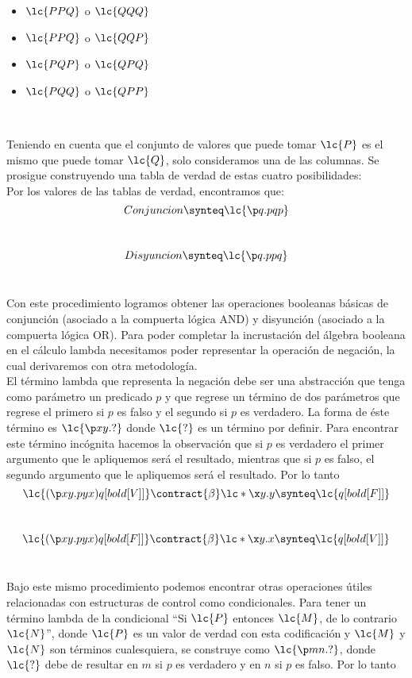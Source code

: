 \begin{itemize}
\item \(\lc{P P Q}\) o \(\lc{Q Q Q}\)
\item \(\lc{P P Q}\) o \(\lc{Q Q P}\)
\item \(\lc{P Q P}\) o \(\lc{Q P Q}\)
\item \(\lc{P Q Q}\) o \(\lc{Q P P}\)
\end{itemize} \

Teniendo en cuenta que el conjunto de valores que puede tomar \(\lc{P}\) es el mismo que puede tomar \(\lc{Q}\), solo consideramos una de las columnas. Se prosigue construyendo una tabla de verdad de estas cuatro posibilidades: \\

Por los valores de las tablas de verdad, encontramos que: \\

\[Conjuncion \synteq \lc{\p q.p q p}\] \

\[Disyuncion \synteq \lc{\p q.p p q}\] \

Con este procedimiento logramos obtener las operaciones booleanas básicas de conjunción (asociado a la compuerta lógica \(\mathrm{AND}\)) y disyunción (asociado a la compuerta lógica \(\mathrm{OR}\)). Para poder completar la incrustación del álgebra booleana en el cálculo lambda necesitamos poder representar la operación de negación, la cual derivaremos con otra metodología. \\

El término lambda que representa la negación debe ser una abstracción que tenga como parámetro un predicado \(p\) y que regrese un término de dos parámetros que regrese el primero si \(p\) es falso y el segundo si \(p\) es verdadero. La forma de éste término es \(\lc{\p x y.?}\) donde \(\lc{?}\) es un término por definir. Para encontrar este término incógnita hacemos la observación que si \(p\) es verdadero el primer argumento que le apliquemos será el resultado, mientras que si \(p\) es falso, el segundo argumento que le apliquemos será el resultado. Por lo tanto \\

\[\lc{(\p x y.p y x)q[bold[V]]} \contract{\beta} \lc*{\x y.y} \synteq \lc{q[bold[F]]}\] \

\[\lc{(\p x y.p y x)q[bold[F]]} \contract{\beta} \lc*{\x y.x} \synteq \lc{q[bold[V]]}\] \

Bajo este mismo procedimiento podemos encontrar otras operaciones útiles relacionadas con estructuras de control como condicionales. Para tener un término lambda de la condicional ``Si \(\lc{P}\) entonces \(\lc{M}\), de lo contrario \(\lc{N}\)'', donde \(\lc{P}\) es un valor de verdad con esta codificación y \(\lc{M}\) y \(\lc{N}\) son términos cualesquiera, se construye como \(\lc{\p m n.?}\), donde \(\lc{?}\) debe de resultar en \(m\) si \(p\) es verdadero y en \(n\) si \(p\) es falso. Por lo tanto \\

